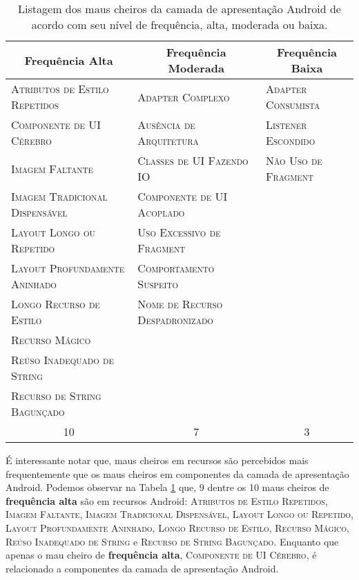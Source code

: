 \begin{table}[!htb]
\centering
\renewcommand*{\arraystretch}{1}
\footnotesize
\caption{Listagem dos maus cheiros da camada de apresentação Android de acordo com seu nível de frequência, alta, moderada ou baixa.}
\begin{tabular}{@{}p{5.2cm}p{5.2cm}p{5.2cm}@{}}
\toprule
\multicolumn{1}{c}{\textbf{Frequência Alta}} & \multicolumn{1}{c}{\textbf{Frequência Moderada}} & \multicolumn{1}{c}{\textbf{Frequência Baixa}} \\
\bottomrule
\textsc{\scriptsize Atributos de Estilo Repetidos}  & \textsc{\scriptsize Adapter Complexo}               & \textsc{\scriptsize Adapter Consumista} \\
\textsc{\scriptsize Componente de UI Cérebro}       & \textsc{\scriptsize Ausência de Arquitetura}        & \textsc{\scriptsize Listener Escondido} \\
\textsc{\scriptsize Imagem Faltante}                & \textsc{\scriptsize Classes de UI Fazendo IO}       & \textsc{\scriptsize Não Uso de Fragment} \\
\textsc{\scriptsize Imagem Tradicional Dispensável} & \textsc{\scriptsize Componente de UI Acoplado}      \\
\textsc{\scriptsize Layout Longo ou Repetido}       & \textsc{\scriptsize Uso Excessivo de Fragment}      \\
\textsc{\scriptsize Layout Profundamente Aninhado}  & \textsc{\scriptsize Comportamento Suspeito}         \\
\textsc{\scriptsize Longo Recurso de Estilo}        & \textsc{\scriptsize Nome de Recurso Despadronizado} \\
\textsc{\scriptsize Recurso Mágico}                 \\
\textsc{\scriptsize Reúso Inadequado de String}     \\
\textsc{\scriptsize Recurso de String Bagunçado}    \\
\toprule
\multicolumn{1}{c}{10} & \multicolumn{1}{c}{7} & \multicolumn{1}{c}{3}\\
\bottomrule
\end{tabular}
\label{tab:SmellFrequency}
\end{table}

É interessante notar que, maus cheiros em recursos são percebidos mais frequentemente que os maus cheiros em componentes da camada de apresentação Android. Podemos observar na Tabela \ref{tab:SmellFrequency} que, 9 dentre os 10 maus cheiros de \textbf{\small frequência alta} são em recursos Android: \textsc{\small Atributos de Estilo Repetidos}, \textsc{\small Imagem Faltante}, \textsc{\small Imagem Tradicional Dispensável}, \textsc{\small Layout Longo ou Repetido}, \textsc{\small Layout Profundamente Aninhado}, \textsc{\small Longo Recurso de Estilo}, \textsc{\small Recurso Mágico}, \textsc{\small Reúso Inadequado de String} e \textsc{\small Recurso de String Bagunçado}. Enquanto que apenas o mau cheiro de \textbf{\small frequência alta}, \textsc{\small Componente de UI Cérebro}, é relacionado a componentes da camada de apresentação Android.

